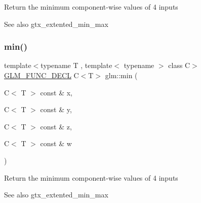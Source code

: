 Return the minimum component-\/wise values of 4 inputs \begin{DoxySeeAlso}{See also}
gtx\+\_\+extented\+\_\+min\+\_\+max 
\end{DoxySeeAlso}
\mbox{\label{group__gtx__extended__min__max_ga7471ea4159eed8dd9ea4ac5d46c2fead}} 
\subsubsection{\texorpdfstring{min()}{min()}\hspace{0.1cm}{\footnotesize\ttfamily [6/6]}}
{\footnotesize\ttfamily template$<$typename T , template$<$ typename $>$ class C$>$ \\
\mbox{\hyperlink{setup_8hpp_ab2d052de21a70539923e9bcbf6e83a51}{G\+L\+M\+\_\+\+F\+U\+N\+C\+\_\+\+D\+E\+CL}} C$<$T$>$ glm\+::min (\begin{DoxyParamCaption}\item[{C$<$ T $>$ const \&}]{x,  }\item[{C$<$ T $>$ const \&}]{y,  }\item[{C$<$ T $>$ const \&}]{z,  }\item[{C$<$ T $>$ const \&}]{w }\end{DoxyParamCaption})}

Return the minimum component-\/wise values of 4 inputs \begin{DoxySeeAlso}{See also}
gtx\+\_\+extented\+\_\+min\+\_\+max 
\end{DoxySeeAlso}
